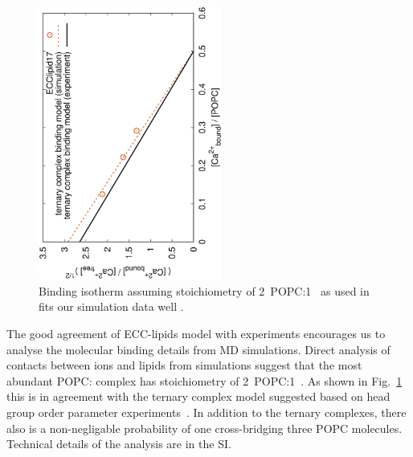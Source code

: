 \documentclass[aip,jcp,twocolumn]{revtex4}
\begin{document}
\begin{figure}[]
  \centering
  \includegraphics[height=9.0cm,angle=-90]{../Fig/bound-CAs_conc-eccl17.eps}
  \caption{\label{fig:cacl-bind}
    Binding isotherm assuming stoichiometry of 2~POPC:1~ as used in \cite{altenbach84} fits our simulation data well .
    }
\end{figure}


The good agreement of ECC-lipids model with experiments encourages us to analyse the
molecular binding details from MD simulations. Direct analysis of contacts between ions and
lipids from simulations suggest that the most abundant POPC: complex 
has stoichiometry of 2~POPC:1~.
As shown in Fig.~\ref{fig:cacl-bind} this is in agreement
with the ternary complex model suggested based on head group order parameter
experiments~\cite{altenbach84}.
In addition to the ternary complexes, there also is a non-negligable probability
of one  cross-bridging three POPC molecules.
Technical details of the analysis are in the SI. 
\end{document}
